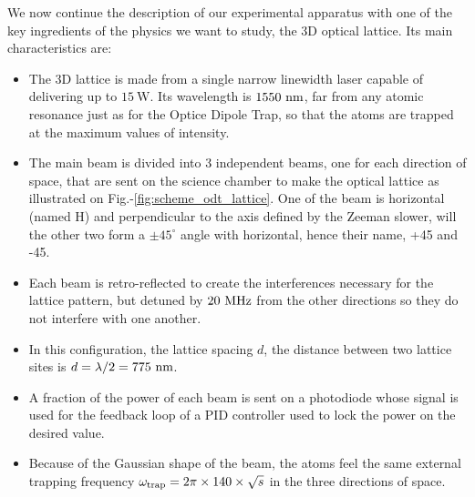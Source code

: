 We now continue the description of our experimental apparatus with one of the key ingredients of the physics we want to study, the 3D optical lattice. Its main characteristics are: 

\begin{itemize}
    \item The 3D lattice is made from a single narrow linewidth laser capable of delivering up to $15 \ \mathrm{W}$. Its wavelength is $1550 \ \rm{nm}$, \ie far from any atomic resonance just as for the Optice Dipole Trap, so that the atoms are trapped at the maximum values of intensity.
    \item  The main beam is divided into 3 independent beams, one for each direction of space, that are sent on the science chamber to make the optical lattice as illustrated on Fig.-\ref{fig:scheme_odt_lattice}. One of the beam is horizontal (named H) and perpendicular to the axis defined by the Zeeman slower, will the other two form a $\pm 45^{\circ}$ angle with horizontal, hence their name, +45 and -45.
    \item  Each beam is retro-reflected to create the interferences necessary for the lattice pattern, but detuned by $20 \ \rm{MHz}$ from the other directions so they do not interfere with one another.
    \item In this configuration, the lattice spacing $d$, \ie the distance between two lattice sites is $d=\lambda/2 = 775 \ \rm{nm}$.
    
    
    
    
    \item A fraction of the power of each beam is sent on a photodiode whose signal is used for the feedback loop of a PID controller used to lock the power on the desired value.
    
    \item Because of the Gaussian shape of the beam, the atoms feel the same external trapping frequency $\omega_{\rm{trap}} = 2 \pi \times 140 \times \sqrt{s}$ in the three directions of space.  
    
\end{itemize}



